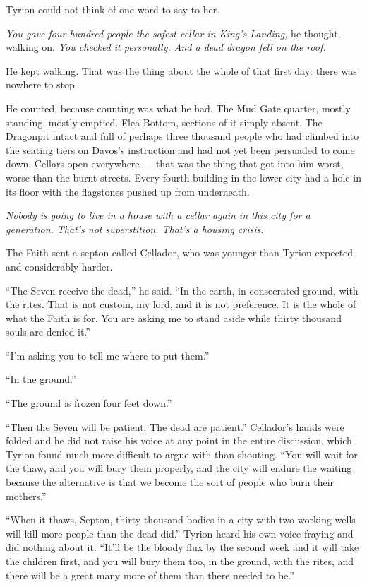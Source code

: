 Tyrion could not think of one word to say to her.

\textit{You gave four hundred people the safest cellar in King’s Landing,} he thought, walking on. \textit{You checked it personally. And a dead dragon fell on the roof.}

He kept walking. That was the thing about the whole of that first day: there was nowhere to stop.

He counted, because counting was what he had. The Mud Gate quarter, mostly standing, mostly emptied. Flea Bottom, sections of it simply absent. The Dragonpit intact and full of perhaps three thousand people who had climbed into the seating tiers on Davos’s instruction and had not yet been persuaded to come down. Cellars open everywhere — that was the thing that got into him worst, worse than the burnt streets. Every fourth building in the lower city had a hole in its floor with the flagstones pushed up from underneath.

\textit{Nobody is going to live in a house with a cellar again in this city for a generation. That’s not superstition. That’s a housing crisis.}

\sceneBreak

The Faith sent a septon called Cellador, who was younger than Tyrion expected and considerably harder.

“The Seven receive the dead,” he said. “In the earth, in consecrated ground, with the rites. That is not custom, my lord, and it is not preference. It is the whole of what the Faith is for. You are asking me to stand aside while thirty thousand souls are denied it.”

“I’m asking you to tell me where to put them.”

“In the ground.”

“The ground is frozen four feet down.”

“Then the Seven will be patient. The dead are patient.” Cellador’s hands were folded and he did not raise his voice at any point in the entire discussion, which Tyrion found much more difficult to argue with than shouting. “You will wait for the thaw, and you will bury them properly, and the city will endure the waiting because the alternative is that we become the sort of people who burn their mothers.”

“When it thaws, Septon, thirty thousand bodies in a city with two working wells will kill more people than the dead did.” Tyrion heard his own voice fraying and did nothing about it. “It’ll be the bloody flux by the second week and it will take the children first, and you will bury them too, in the ground, with the rites, and there will be a great many more of them than there needed to be.”

